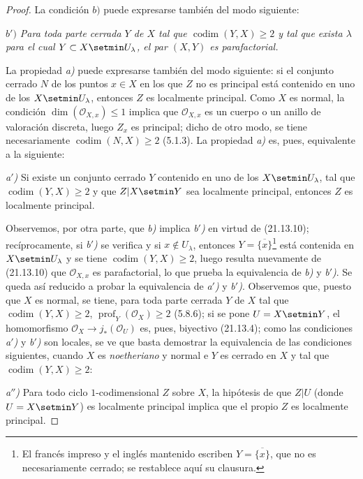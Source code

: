 \begin{proof}
La condición $b)$ puede expresarse también del modo siguiente:

\emph{$b')$ Para toda parte cerrada $Y$ de $X$ tal que
$\operatorname{codim}(Y,X)\geq2$ y tal que exista $\lambda$ para el cual
$Y\subset X\setmin U_\lambda$, el par $(X,Y)$ es parafactorial.}

La propiedad \emph{a)} puede expresarse también del modo siguiente: si el conjunto cerrado
$N$ de los puntos $x\in X$ en los que $Z$ no es principal está contenido en uno de los
$X\setmin U_\lambda$, entonces $Z$ es localmente principal. Como $X$ es normal, la condición
$\dim(\mathcal O_{X,x})\leq1$ implica que $\mathcal O_{X,x}$ es un cuerpo o un
anillo de valoración discreta, luego $Z_x$ es principal; dicho de otro modo, se tiene
necesariamente $\operatorname{codim}(N,X)\geq2$ (5.1.3). La propiedad \emph{a)} es, pues,
equivalente a la siguiente:

\emph{a$'$)} Si existe un conjunto cerrado $Y$ contenido en uno de los $X\setmin U_\lambda$, tal
que $\operatorname{codim}(Y,X)\geq2$ y que $Z|X\setmin Y$ sea localmente principal,
entonces $Z$ es localmente principal.

Observemos, por otra parte, que \emph{b)} implica \emph{b$'$)} en virtud de (21.13.10); recíprocamente, si
\emph{b$'$)} se verifica y si $x\notin U_\lambda$, entonces $Y=\overline{\{x\}}$\footnote{El francés impreso y el inglés mantenido escriben $Y=\overline{\{x\}}$,
que no es necesariamente cerrado; se restablece aquí su clausura.} está contenida en
$X\setmin U_\lambda$ y se tiene $\operatorname{codim}(Y,X)\geq2$, luego resulta nuevamente de
(21.13.10) que $\mathcal O_{X,x}$ es parafactorial, lo que prueba la equivalencia de
\emph{b)} y \emph{b$'$)}. Se queda así reducido a probar la equivalencia de \emph{a$'$)} y \emph{b$'$)}.
Observemos que, puesto que $X$ es normal, se tiene, para toda parte cerrada $Y$ de $X$ tal que
$\operatorname{codim}(Y,X)\geq2$, $\operatorname{prof}_Y(\mathcal O_X)\geq2$
(5.8.6); si se pone $U=X\setmin Y$, el homomorfismo
$\mathcal O_X\to j_*(\mathcal O_U)$ es, pues, biyectivo (21.13.4); como las condiciones
\emph{a$'$)} y \emph{b$'$)} son locales, se ve que basta demostrar la equivalencia de las
condiciones siguientes, cuando $X$ es \emph{noetheriano} y normal e $Y$ es cerrado en $X$ y
tal que $\operatorname{codim}(Y,X)\geq2$:

\emph{a$''$)} Para todo ciclo $1$-codimensional $Z$ sobre $X$, la hipótesis de que $Z|U$
(donde $U=X\setmin Y$) es localmente principal implica que el propio $Z$ es localmente
principal.


\end{proof}
